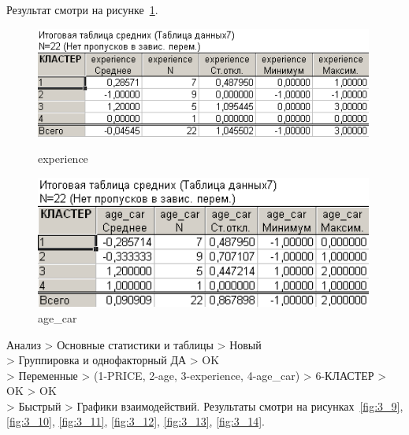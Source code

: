Результат смотри на рисунке~\ref{fig:3_8}.

\begin{figure}[!h]
  \centering
  \begin{minipage}{0.49\textwidth}
    \centering

    \includegraphics[width=0.99\textwidth]
    {inc/cars_my/3.7.PNG}

    \caption{experience}
    \label{fig:3_7}
  \end{minipage}
  \begin{minipage}{0.49\textwidth}
    \centering

    \includegraphics[width=0.99\textwidth]
    {inc/cars_my/3.8.PNG}

    \caption{age\_car}
    \label{fig:3_8}
  \end{minipage}
\end{figure}

Анализ > Основные статистики и таблицы > Новый\\
> Группировка и однофакторный ДА > OK\\
> Переменные > (1-PRICE, 2-age, 3-experience, 4-age\_car) > 6-КЛАСТЕР > OK > OK\\
> Быстрый > Графики взаимодействий. Результаты смотри на рисунках~\ref{fig:3_9}, \ref{fig:3_10}, \ref{fig:3_11}, \ref{fig:3_12}, \ref{fig:3_13}, \ref{fig:3_14}.

